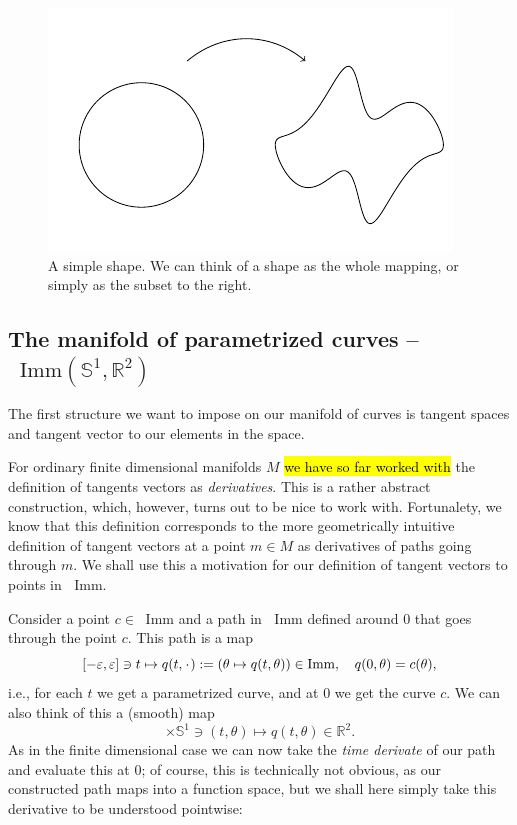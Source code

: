 \documentclass[a4,danish]{article}
\theoremstyle{break}
\theoremstyle{definition}
\theoremstyle{Break}
\newcommand{\R}{\mathbb{R}}
\newcommand*\I{\mathop{}\!\mathrm{Imm}}
\renewcommand{\S}{\mathbb{S}}
\newcommand{\blank}{\makebox[1ex]{\textbf{$\cdot$}}}
\renewcommand{\epsilon}{\varepsilon}
\begin{document}
\begin{figure}
  \label{fig:circle-mapping}
  \centerline{\includegraphics[width=0.9\linewidth]{circle_mapping.pdf}}
  \caption{A simple shape. We can think of a shape as the whole mapping, or simply as the subset to the right.}
\end{figure}

\subsection*{The manifold of parametrized curves -- $\I(\S^1, \R^2)$}
\label{sec:parametrized-curves}

The first structure we want to impose on our manifold of curves is tangent spaces and tangent vector to our elements in the space.

For ordinary finite dimensional manifolds $M$ \hl{we have so far worked with} the definition of tangents vectors as \textit{derivatives}. This is a rather abstract construction, which, however, turns out to be nice to work with. Fortunalety, we know that this definition corresponds to the more geometrically intuitive definition of tangent vectors at a point $m \in M$ as derivatives of paths going through $m$. We shall use this a motivation for our definition of tangent vectors to points in $\I$.

Consider a point $c\in \I$ and a path in $\I$ defined around $0$ that goes through the point $c$. This path is a map
\begin{equation}
  \label{eq:path-in-imm}
  [-\epsilon, \epsilon] \ni t \mapsto  q(t, \blank) :=  (\theta\mapsto q(t, \theta)) \in \I,
  \quad q(0,\theta) = c(\theta),
\end{equation}
i.e., for each $t$ we get a parametrized curve, and at 0 we get the curve $c$. We can also think of this a (smooth) map
\begin{equation*}
  [-\epsilon, \epsilon] \times \S^1  \ni (t, \theta) \mapsto q(t, \theta) \in \R^2.
\end{equation*}
As in the finite dimensional case we can now take the \textit{time derivate} of our path and evaluate this at 0; of course, this is technically not obvious, as our constructed path maps into a function space, but we shall here simply take this derivative to be understood pointwise:
\end{document}
